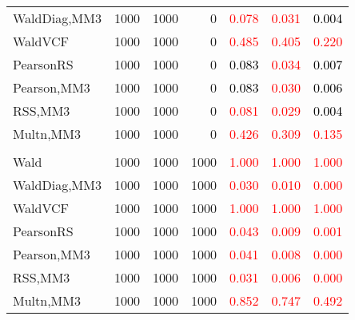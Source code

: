 \documentclass[
]{article}
\begin{document}
\begin{table}[H]
{\begin{tabular}[t]{lrrrrrr}
\hspace{1em}WaldDiag,MM3 & 1000 & 1000 & 0 & \textcolor{red}{0.078} & \textcolor{red}{0.031} & \textcolor{black}{0.004}\\
\hspace{1em}WaldVCF & 1000 & 1000 & 0 & \textcolor{red}{0.485} & \textcolor{red}{0.405} & \textcolor{red}{0.220}\\
\hspace{1em}PearsonRS & 1000 & 1000 & 0 & \textcolor{black}{0.083} & \textcolor{red}{0.034} & \textcolor{black}{0.007}\\
\hspace{1em}Pearson,MM3 & 1000 & 1000 & 0 & \textcolor{black}{0.083} & \textcolor{red}{0.030} & \textcolor{black}{0.006}\\
\hspace{1em}RSS,MM3 & 1000 & 1000 & 0 & \textcolor{red}{0.081} & \textcolor{red}{0.029} & \textcolor{black}{0.004}\\
\hspace{1em}Multn,MM3 & 1000 & 1000 & 0 & \textcolor{red}{0.426} & \textcolor{red}{0.309} & \textcolor{red}{0.135}\\
\addlinespace[0.3em]
\multicolumn{7}{l}{\textbf{1F 15V}}\\
\hspace{1em}Wald & 1000 & 1000 & 1000 & \textcolor{red}{1.000} & \textcolor{red}{1.000} & \vphantom{1} \textcolor{red}{1.000}\\
\hspace{1em}WaldDiag,MM3 & 1000 & 1000 & 1000 & \textcolor{red}{0.030} & \textcolor{red}{0.010} & \textcolor{red}{0.000}\\
\hspace{1em}WaldVCF & 1000 & 1000 & 1000 & \textcolor{red}{1.000} & \textcolor{red}{1.000} & \vphantom{1} \textcolor{red}{1.000}\\
\hspace{1em}PearsonRS & 1000 & 1000 & 1000 & \textcolor{red}{0.043} & \textcolor{red}{0.009} & \textcolor{red}{0.001}\\
\hspace{1em}Pearson,MM3 & 1000 & 1000 & 1000 & \textcolor{red}{0.041} & \textcolor{red}{0.008} & \textcolor{red}{0.000}\\
\hspace{1em}RSS,MM3 & 1000 & 1000 & 1000 & \textcolor{red}{0.031} & \textcolor{red}{0.006} & \textcolor{red}{0.000}\\
\hspace{1em}Multn,MM3 & 1000 & 1000 & 1000 & \textcolor{red}{0.852} & \textcolor{red}{0.747} & \textcolor{red}{0.492}\\

\end{tabular}}
\end{table}
\end{document}
